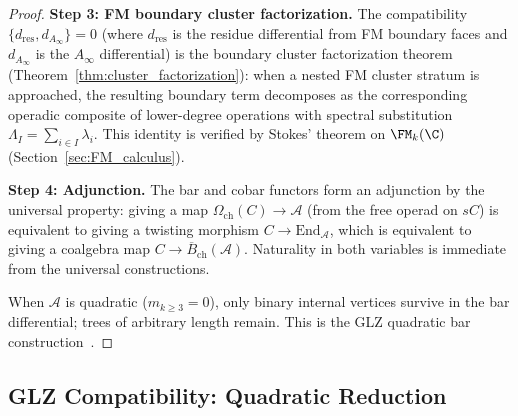 \begin{proof}
\textbf{Step 3: FM boundary cluster factorization.}
The compatibility $\{d_{\mathrm{res}}, d_{A_\infty}\} = 0$ (where $d_{\mathrm{res}}$ is the residue differential from FM boundary faces and $d_{A_\infty}$ is the $A_\infty$ differential) is the boundary cluster factorization theorem (Theorem~\ref{thm:cluster_factorization}): when a nested FM cluster stratum is approached, the resulting boundary term decomposes as the corresponding operadic composite of lower-degree operations with spectral substitution $\Lambda_I = \sum_{i \in I} \lambda_i$. This identity is verified by Stokes' theorem on $\FM_k(\C)$ (Section~\ref{sec:FM_calculus}).

\textbf{Step 4: Adjunction.}
The bar and cobar functors form an adjunction by the universal property: giving a map $\Omega_{\mathrm{ch}}(C) \to \mathcal{A}$ (from the free operad on $sC$) is equivalent to giving a twisting morphism $C \to \mathrm{End}_{\mathcal{A}}$, which is equivalent to giving a coalgebra map $C \to \overline{B}_{\mathrm{ch}}(\mathcal{A})$. Naturality in both variables is immediate from the universal constructions.

When $\mathcal{A}$ is quadratic ($m_{k \geq 3} = 0$), only binary
internal vertices survive in the bar differential; trees of arbitrary
length remain. This is the GLZ quadratic bar construction~\cite{GLZ22}.
\end{proof}

\subsection{GLZ Compatibility: Quadratic Reduction}

